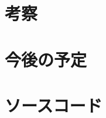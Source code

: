 \documentclass[twocolumn]{jarticle}     %
\begin{document}
\section{考察}

\section{今後の予定}


\section{ソースコード}




\end{document}
